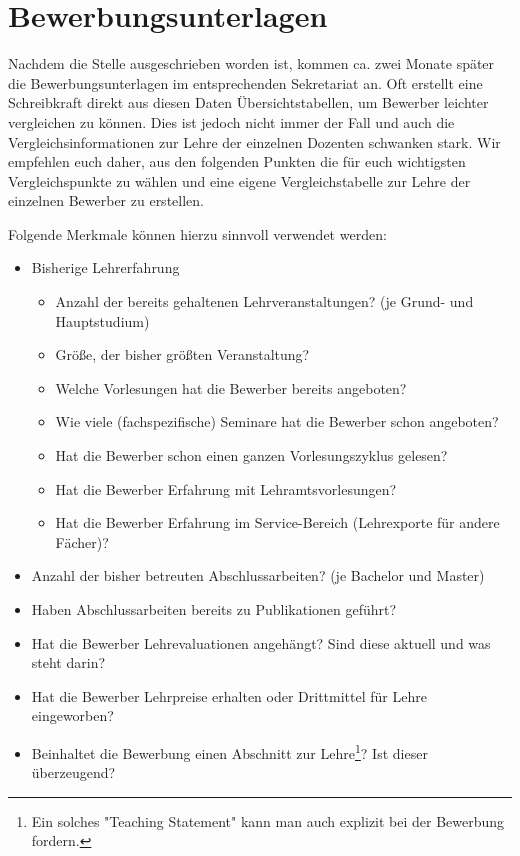 \section{Bewerbungsunterlagen}\thispagestyle{fancy}
Nachdem die Stelle ausgeschrieben worden ist, kommen ca. zwei Monate später die Bewerbungsunterlagen im entsprechenden Sekretariat an. Oft erstellt eine Schreibkraft direkt aus diesen Daten Übersichtstabellen, um Bewerber leichter vergleichen zu können. Dies ist jedoch nicht immer der Fall und auch die Vergleichsinformationen zur Lehre der einzelnen Dozenten schwanken stark. Wir empfehlen euch daher, aus den folgenden Punkten die für euch wichtigsten Vergleichspunkte zu wählen und eine eigene Vergleichstabelle zur Lehre der einzelnen Bewerber zu erstellen.

Folgende Merkmale können hierzu sinnvoll verwendet werden:
\begin{itemize}
    \item Bisherige Lehrerfahrung
    \begin{itemize}
        \item Anzahl der bereits gehaltenen Lehrveranstaltungen? (je Grund- und Hauptstudium)
        \item Größe, der bisher größten Veranstaltung?
        \item Welche Vorlesungen hat die Bewerber bereits angeboten?
        \item Wie viele (fachspezifische) Seminare hat die Bewerber schon angeboten?
        \item Hat die Bewerber schon einen ganzen Vorlesungszyklus gelesen?
        \item Hat die Bewerber Erfahrung mit Lehramtsvorlesungen?
        \item Hat die Bewerber Erfahrung im Service-Bereich (Lehrexporte für andere Fächer)?    
    \end{itemize}
    \item Anzahl der bisher betreuten Abschlussarbeiten? (je Bachelor und Master)
    \item Haben Abschlussarbeiten bereits zu Publikationen geführt?
    \item Hat die Bewerber Lehrevaluationen angehängt? Sind diese aktuell und was steht darin? 
    \item Hat die Bewerber Lehrpreise erhalten oder Drittmittel für Lehre eingeworben?
    \item Beinhaltet die Bewerbung einen Abschnitt zur Lehre\footnote{Ein solches "Teaching Statement" kann man auch explizit bei der Bewerbung fordern.}? Ist dieser überzeugend?
\end{itemize}

